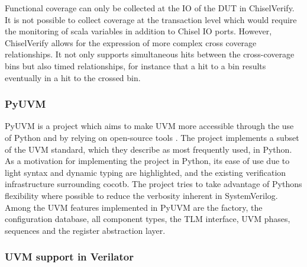 Functional coverage can only be collected at the IO of the DUT in ChiselVerify. It is not possible to collect
coverage at the transaction level which would require the monitoring of scala variables in addition to Chisel IO
ports. However, ChiselVerify allows for the expression of more complex cross coverage relationships. It not only
supports simultaneous hits between the cross-coverage bins but also timed relationships, for instance that a hit to a
bin results eventually in a hit to the crossed bin.

\subsubsection{PyUVM} %

PyUVM is a project which aims to make UVM more accessible through the use of Python and by relying on open-source
tools \cite{pyuvm}. The project implements a subset of the UVM standard, which they describe as most frequently used,
in Python. As a motivation for implementing the project in Python, its ease of use due to light syntax and dynamic
typing are highlighted, and the existing verification infrastructure surrounding cocotb. The project tries to take
advantage of Pythons flexibility where possible to reduce the verbosity inherent in SystemVerilog. Among the UVM
features implemented in PyUVM are the factory, the configuration database, all component types, the TLM interface,
UVM phases, sequences and the register abstraction layer.

\subsubsection{UVM support in Verilator} %

